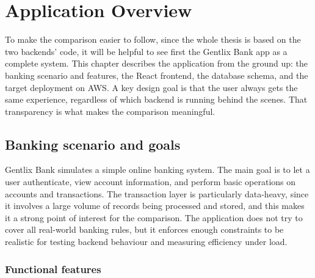 \chapter{Application Overview}
\label{chap:ch2}

\par To make the comparison easier to follow, since the whole thesis is based on the two backends' code, it will be helpful to see first the Gentlix Bank app as a complete system. This chapter describes the application from the ground up: the banking scenario and features, the React frontend, the database schema, and the target deployment on AWS. A key design goal is that the user always gets the same experience, regardless of which backend is running behind the scenes. That transparency is what makes the comparison meaningful.

\section{Banking scenario and goals}
\label{sec:ch2sec1}

\par Gentlix Bank simulates a simple online banking system. The main goal is 
to let a user authenticate, view account information, and perform basic 
operations on accounts and transactions. The transaction layer is particularly 
data-heavy, since it involves a large volume of records being processed and 
stored, and this makes it a strong point of interest for the comparison. The 
application does not try to cover all real-world banking rules, but it enforces 
enough constraints to be realistic for testing backend behaviour and measuring 
efficiency under load.

\subsection{Functional features}
\label{sec:ch2sec1sub1}

